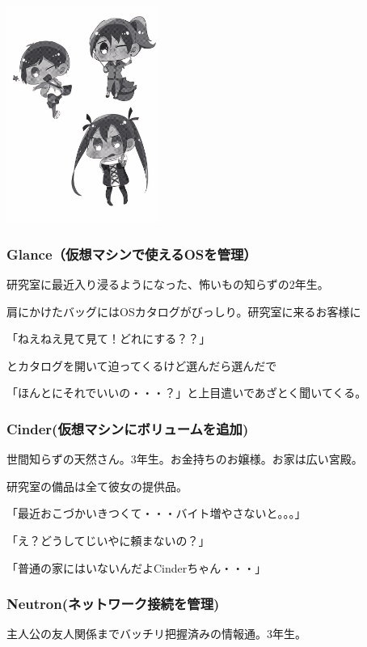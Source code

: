 \documentclass[8pt,b5paper,tombo,openany]{jsbook}
\begin{document}
\begin{floatingfigure}[r]{5cm}
  \includegraphics[width=5cm]{./img/char2.pdf}
\end{floatingfigure}

\subsubsection{Glance（仮想マシンで使えるOSを管理）}

研究室に最近入り浸るようになった、怖いもの知らずの2年生。

肩にかけたバッグにはOSカタログがびっしり。研究室に来るお客様に

「ねえねえ見て見て！どれにする？？」

とカタログを開いて迫ってくるけど選んだら選んだで

「ほんとにそれでいいの・・・？」と上目遣いであざとく聞いてくる。

\subsubsection{Cinder(仮想マシンにボリュームを追加)}

世間知らずの天然さん。3年生。お金持ちのお嬢様。お家は広い宮殿。

研究室の備品は全て彼女の提供品。

「最近おこづかいきつくて・・・バイト増やさないと。。。」

「え？どうしてじいやに頼まないの？」

「普通の家にはいないんだよCinderちゃん・・・」

\subsubsection{Neutron(ネットワーク接続を管理)}

主人公の友人関係までバッチリ把握済みの情報通。3年生。
\end{document}
